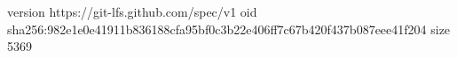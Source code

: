 version https://git-lfs.github.com/spec/v1
oid sha256:982e1e0e41911b836188cfa95bf0c3b22e406ff7c67b420f437b087eee41f204
size 5369
